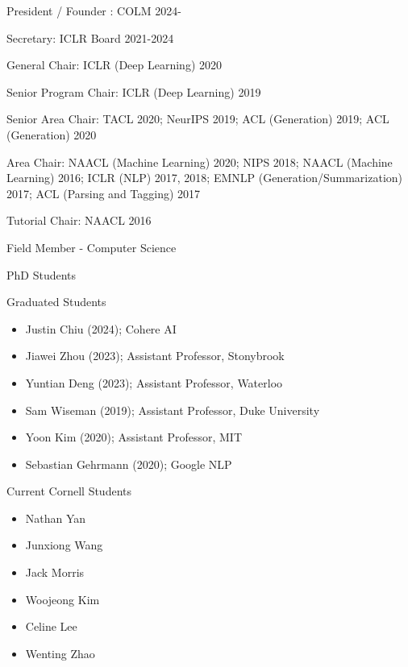 \documentclass[10pt]{article}
\begin{document}
{
\medskip


\bigskip

\ind President / Founder :
\ind COLM 2024-

\ind Secretary:
\ind ICLR Board 2021-2024

\ind General  Chair:
\ind ICLR (Deep Learning) 2020

\ind Senior Program Chair:
\ind ICLR (Deep Learning) 2019

\ind Senior Area Chair:
\ind TACL 2020; NeurIPS 2019; ACL (Generation) 2019; ACL (Generation) 2020

\ind Area Chair:
\ind NAACL (Machine Learning) 2020; NIPS 2018; NAACL (Machine Learning) 2016; ICLR (NLP) 2017, 2018; EMNLP (Generation/Summarization) 2017; ACL (Parsing and Tagging) 2017

\ind Tutorial Chair: NAACL 2016

\bigskip

\medskip

\ind Field Member - Computer Science

\ind PhD Students


\ind Graduated Students

\begin{itemize}
	\item Justin Chiu (2024); Cohere AI
	\item Jiawei Zhou (2023); Assistant Professor, Stonybrook
	\item Yuntian Deng (2023); Assistant Professor, Waterloo
	\item Sam Wiseman (2019); Assistant Professor, Duke University
	\item Yoon Kim (2020); Assistant Professor, MIT
	\item Sebastian Gehrmann (2020); Google NLP
\end{itemize}


\ind Current Cornell Students

\begin{itemize}
	\item Nathan Yan
	\item Junxiong Wang
	\item Jack Morris
	\item Woojeong Kim
	\item Celine Lee
	\item Wenting Zhao
\end{itemize}


\medskip

}
\end{document}
